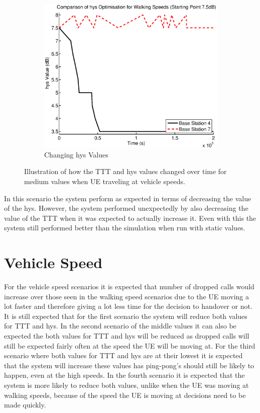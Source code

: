 \begin{figure}[H]
\begin{subfigure}[b]{0.49\textwidth}
                \includegraphics[width=\textwidth]{figures/walking_figures/highhys/long_hys.eps}
                \caption{Changing hys Values}
                \label{fig:walk_highhys_hys}
        \end{subfigure}
        \caption{Illustration of how the TTT and hys values changed over time for medium values when UE traveling at vehicle speeds.}\label{fig:walk_highhys_ttthys}
\end{figure}
In this scenario the system perform as expected in terms of decreasing the value of the hys. However, the system performed unexpectedly by also decreasing the value of the TTT when it was expected to actually increase it. Even with this the system still performed better than the simulation when run with static values.

\section{Vehicle Speed}
For the vehicle speed scenarios it is expected that number of dropped calls would increase over those seen in the walking speed scenarios due to the UE moving a lot faster and therefore giving a lot less time for the decision to handover or not. It is still expected that for the first scenario the system will reduce both values for TTT and hys. In the second scenario of the middle values it can also be expected the both values for TTT and hys will be reduced as dropped calls will still be expected fairly often at the speed the UE will be moving at. For the third scenario where both values for TTT and hys are at their lowest it is expected that the system will increase these values has ping-pong's should still be likely to happen, even at the high speeds. In the fourth scenario it is expected that the system is more likely to reduce both values, unlike when the UE was moving at walking speeds, because of the speed the UE is moving at decisions need to be made quickly.

